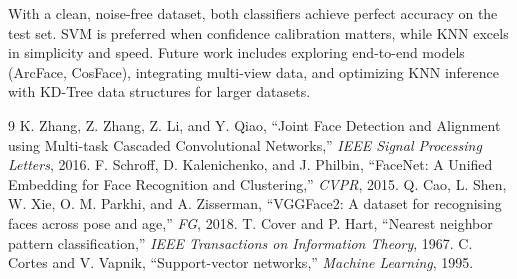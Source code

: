 \documentclass[12pt,a4paper]{article}
\begin{document}
With a clean, noise-free dataset, both classifiers achieve perfect accuracy on the test set. SVM is preferred when confidence calibration matters, while KNN excels in simplicity and speed. Future work includes exploring end-to-end models (ArcFace, CosFace), integrating multi-view data, and optimizing KNN inference with KD-Tree data structures for larger datasets.

\newpage

\begin{thebibliography}{9}
 K. Zhang, Z. Zhang, Z. Li, and Y. Qiao, ``Joint Face Detection and Alignment using Multi-task Cascaded Convolutional Networks,'' \textit{IEEE Signal Processing Letters}, 2016.
 F. Schroff, D. Kalenichenko, and J. Philbin, ``FaceNet: A Unified Embedding for Face Recognition and Clustering,'' \textit{CVPR}, 2015.
 Q. Cao, L. Shen, W. Xie, O. M. Parkhi, and A. Zisserman, ``VGGFace2: A dataset for recognising faces across pose and age,'' \textit{FG}, 2018.
 T. Cover and P. Hart, ``Nearest neighbor pattern classification,'' \textit{IEEE Transactions on Information Theory}, 1967.
 C. Cortes and V. Vapnik, ``Support-vector networks,'' \textit{Machine Learning}, 1995.
\end{thebibliography}
\end{document}
